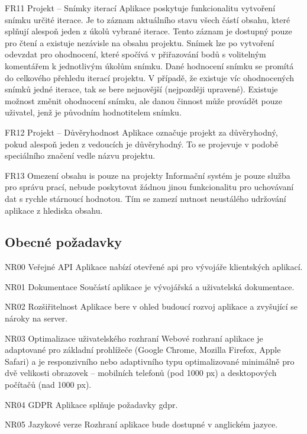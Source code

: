 \begin{dl}
   \item[FR11 Projekt -- Snímky iterací]
   Aplikace poskytuje funkcionalitu vytvoření snímku určité iterace. Je to záznam aktuálního stavu všech částí obsahu, které splňují alespoň jeden z úkolů vybrané iterace. Tento záznam je dostupný pouze pro čtení a existuje nezávisle na obsahu projektu. Snímek lze po vytvoření odevzdat pro ohodnocení, které spočívá v přiřazování bodů s volitelným komentářem k jednotlivým úkolům snímku. Dané hodnocení snímku se promítá do celkového přehledu iterací projektu. V případě, že existuje víc ohodnocených snímků jedné iterace, tak se bere nejnovější (nejpozději upravené). Existuje možnost změnit ohodnocení snímku, ale danou činnost může provádět pouze uživatel, jenž je původním hodnotitelem snímku.

   \item[FR12 Projekt -- Důvěryhodnost]
   Aplikace označuje projekt za důvěryhodný, pokud alespoň jeden z vedoucích je důvěryhodný. To se projevuje v podobě speciálního značení vedle názvu projektu.

   \item[FR13 Omezení obsahu \gls{is} pouze na projekty]
   Informační systém je pouze služba pro správu prací, nebude poskytovat žádnou jinou funkcionalitu pro uchovávaní dat s rychle stárnoucí hodnotou. Tím se zamezí nutnost neustálého udržování aplikace z hlediska obsahu.

\end{dl}


\subsection{Obecné požadavky}

\begin{dl}
   \item[NR00 Veřejné API]
   Aplikace nabízí otevřené \gls{api} pro vývojáře klientských aplikací.

   \item[NR01 Dokumentace]
   Součástí aplikace je vývojářská a uživatelská dokumentace.

   \item[NR02 Rozšiřitelnost]
   Aplikace bere v ohled budoucí rozvoj aplikace a zvyšující se nároky na server.

   \item[NR03 Optimalizace uživatelského rozhraní]
   Webové rozhraní aplikace je adaptované pro základní prohlížeče (Google Chrome, Mozilla Firefox, Apple Safari) a je responzivního nebo adaptivního typu optimalizované minimálně pro dvě velikosti obrazovek -- mobilních telefonů (pod 1000 px) a desktopových počítačů (nad 1000 px).

   \newpage
   \item[NR04 GDPR] 
   Aplikace splňuje požadavky \gls{gdpr}.

   \item[NR05 Jazykové verze] 
   Rozhraní aplikace bude dostupné v anglickém jazyce.
\end{dl}
